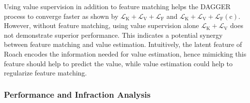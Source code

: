 Using value supervision in addition to feature matching helps the DAGGER process to converge faster as shown by $\mathcal{L}_\text{K}+\mathcal{L}_\text{V}+\mathcal{L}_\text{F}$ and $\mathcal{L}_\text{K}+\mathcal{L}_\text{V}+\mathcal{L}_\text{F}(\text{c})$.
However, without feature matching, using value supervision alone $\mathcal{L}_\text{K}+\mathcal{L}_\text{V}$ does not demonstrate superior performance.
This indicates a potential synergy between feature matching and value estimation.
Intuitively, the latent feature of Roach encodes the information needed for value estimation, hence mimicking this feature should help to predict the value,
while value estimation could help to regularize feature matching.


%


\subsubsection{Performance and Infraction Analysis}

